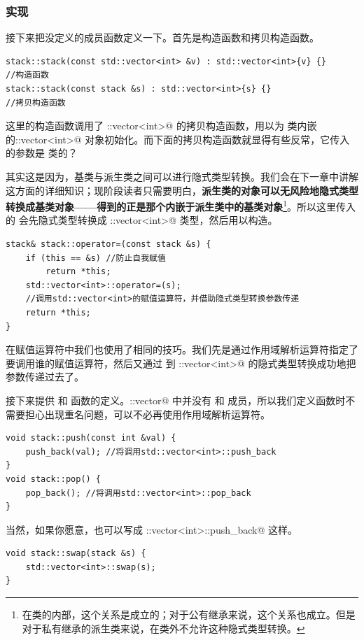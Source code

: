 \subsubsection*{实现}
接下来把没定义的成员函数定义一下。首先是构造函数和拷贝构造函数。
\begin{lstlisting}
stack::stack(const std::vector<int> &v) : std::vector<int>{v} {}
//构造函数
stack::stack(const stack &s) : std::vector<int>{s} {}
//拷贝构造函数
\end{lstlisting}
这里的构造函数调用了 \lstinline@std::vector<int>@ 的拷贝构造函数，用以为 \lstinline@stack@ 类内嵌的\newline\lstinline@std::vector<int>@ 对象初始化。而下面的拷贝构造函数就显得有些反常，它传入的参数是 \lstinline@stack@ 类的？\par
其实这是因为，基类与派生类之间可以进行隐式类型转换。我们会在下一章中讲解这方面的详细知识；现阶段读者只需要明白，\textbf{派生类的对象可以无风险地隐式类型转换成基类对象——得到的正是那个内嵌于派生类中的基类对象}\footnote{在类的内部，这个关系是成立的；对于公有继承来说，这个关系也成立。但是对于私有继承的派生类来说，在类外不允许这种隐式类型转换。}。所以这里传入的 \lstinline@s@ 会先隐式类型转换成 \lstinline@std::vector<int>@ 类型，然后用以构造。\par
\begin{lstlisting}
stack& stack::operator=(const stack &s) {
    if (this == &s) //防止自我赋值
        return *this;
    std::vector<int>::operator=(s);
    //调用std::vector<int>的赋值运算符，并借助隐式类型转换参数传递
    return *this;
}
\end{lstlisting}
在赋值运算符中我们也使用了相同的技巧。我们先是通过作用域解析运算符指定了要调用谁的赋值运算符，然后又通过 \lstinline@stack@ 到 \lstinline@std::vector<int>@ 的隐式类型转换成功地把参数传递过去了。\par
接下来提供 \lstinline@push@ 和 \lstinline@pop@ 函数的定义。\lstinline@std::vector@ 中并没有 \lstinline@push@ 和 \lstinline@pop@ 成员，所以我们定义函数时不需要担心出现重名问题，可以不必再使用作用域解析运算符。
\begin{lstlisting}
void stack::push(const int &val) {
    push_back(val); //将调用std::vector<int>::push_back
}
void stack::pop() {
    pop_back(); //将调用std::vector<int>::pop_back
}
\end{lstlisting}
当然，如果你愿意，也可以写成 \lstinline@std::vector<int>::push_back@ 这样。\par
\begin{lstlisting}
void stack::swap(stack &s) {
    std::vector<int>::swap(s);
}
\end{lstlisting}
